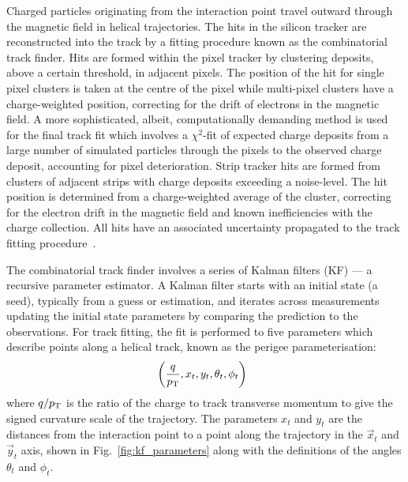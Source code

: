 Charged particles originating from the interaction point travel outward
through the magnetic field in helical trajectories. The hits in the silicon
tracker are reconstructed into the track by a fitting procedure known as the
combinatorial track finder. Hits are formed within the pixel tracker by
clustering deposits, above a certain threshold, in adjacent pixels. The
position of the hit for single pixel clusters is taken at the centre of the
pixel while multi-pixel clusters have a charge-weighted position, correcting
for the drift of electrons in the magnetic field. A more sophisticated,
albeit, computationally demanding method is used for the final track fit which
involves a $\chi^2$-fit of expected charge deposits from a large number of
simulated particles through the pixels to the observed charge deposit,
accounting for pixel deterioration. Strip tracker hits are formed from
clusters of adjacent strips with charge deposits exceeding a noise-level. The
hit position is determined from a charge-weighted average of the cluster,
correcting for the electron drift in the magnetic field and known
inefficiencies with the charge collection. All hits have an associated
uncertainty propagated to the track fitting procedure~\cite{Chatrchyan:1704291}.

The combinatorial track finder involves a series of Kalman filters (KF)
\cite{Kalman:1960} --- a recursive parameter estimator. A Kalman filter starts
with an initial state (a seed), typically from a guess or estimation,
and iterates across measurements updating the initial state parameters by
comparing the prediction to the observations. For track fitting, the fit is
performed to five parameters which describe points along a helical track, known
as the perigee parameterisation:
%
\begin{equation}
    \left( \frac{q}{p_{\text{T}}}, x_t, y_t, \theta_t, \phi_t \right)\ \,
\end{equation}
%
where $q/p_{\text{T}}$ is the ratio of the charge to track transverse momentum to give
the signed curvature scale of the trajectory. The parameters $x_t$ and $y_t$
are the distances from the interaction point to a point along the trajectory
in the $\vec{x}_t$ and $\vec{y}_t$ axis, shown in Fig.~\ref{fig:kf_parameters}
along with the definitions of the angles $\theta_t$ and $\phi_t$.

